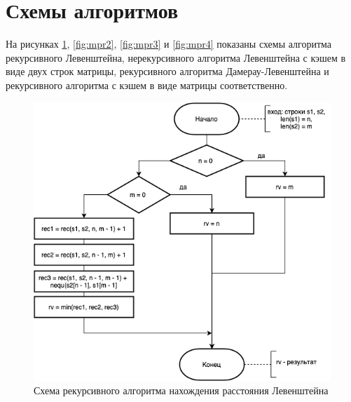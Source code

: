 \documentclass{report}
\begin{document}
\section{Схемы алгоритмов}\label{schemes}

На рисунках \ref{fig:mpr1}, \ref{fig:mpr2}, \ref{fig:mpr3} и \ref{fig:mpr4} показаны схемы алгоритма рекурсивного Левенштейна, нерекурсивного алгоритма Левенштейна с кэшем в виде двух строк матрицы, рекурсивного алгоритма Дамерау-Левенштейна и рекурсивного алгоритма с кэшем в виде матрицы соответственно.
\begin{figure}[h!p]\label{recLev}
	\centering
	\includegraphics[scale = 0.7]{recLev.drawio.png}
	\caption{Схема рекурсивного алгоритма нахождения расстояния Левенштейна}
	\label{fig:mpr1}
\end{figure}
\end{document}
